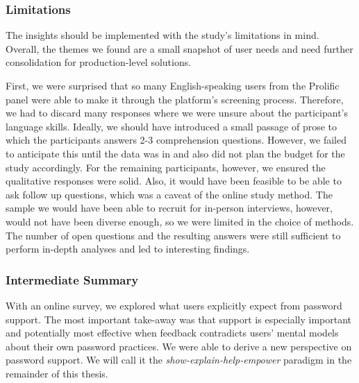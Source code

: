 


\subsubsection{Limitations}
The insights should be implemented with the study's limitations in mind. Overall, the themes we found are a small snapshot of user needs and need further consolidation for production-level solutions. 

First, we were surprised that so many English-speaking users from the Prolific panel were able to make it through the platform's screening process. Therefore, we had to discard many responses where we were unsure about the participant's language skills. Ideally, we should have introduced a small passage of prose to which the participants answers 2-3 comprehension questions. However, we failed to anticipate this until the data was in and also did not plan the budget for the study accordingly. For the remaining participants, however, we ensured the qualitative responses were solid. 
Also, it would have been feasible to be able to ask follow up questions, which was a caveat of the online study method. The sample we would have been able to recruit for in-person interviews, however, would not have been diverse enough, so we were limited in the choice of methods. The number of open questions and the resulting answers were still sufficient to perform in-depth analyses and led to interesting findings. %

\subsubsection{Intermediate Summary}
With an online survey, we explored what users explicitly expect from password support. The most important take-away was that support is especially important and potentially most effective when feedback contradicts users' mental models about their own password practices. We were able to derive a new perspective on password support. We will call it the \textit{show-explain-help-empower} paradigm in the remainder of this thesis. 

